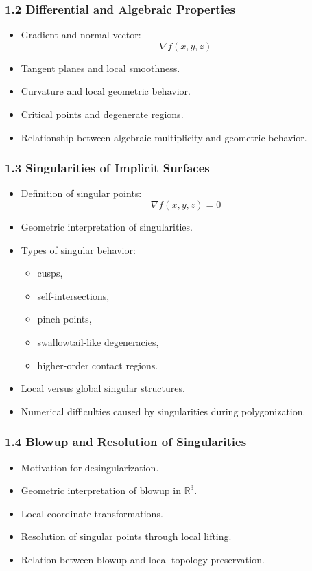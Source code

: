 \documentclass[12pt,a4paper]{article}
\begin{document}
\subsubsection*{1.2 Differential and Algebraic Properties}
\begin{itemize}
    \item Gradient and normal vector:
    \[
    \nabla f(x,y,z)
    \]
    \item Tangent planes and local smoothness.
    \item Curvature and local geometric behavior.
    \item Critical points and degenerate regions.
    \item Relationship between algebraic multiplicity and geometric behavior.
\end{itemize}

\subsubsection*{1.3 Singularities of Implicit Surfaces}
\begin{itemize}
    \item Definition of singular points:
    \[
    \nabla f(x,y,z)=0
    \]
    \item Geometric interpretation of singularities.
    \item Types of singular behavior:
    \begin{itemize}
        \item cusps,
        \item self-intersections,
        \item pinch points,
        \item swallowtail-like degeneracies,
        \item higher-order contact regions.
    \end{itemize}
    \item Local versus global singular structures.
    \item Numerical difficulties caused by singularities during polygonization.
\end{itemize}

\subsubsection*{1.4 Blowup and Resolution of Singularities}
\begin{itemize}
    \item Motivation for desingularization.
    \item Geometric interpretation of blowup in $\mathbb{R}^3$.
    \item Local coordinate transformations.
    \item Resolution of singular points through local lifting.
    \item Relation between blowup and local topology preservation.
\end{itemize}
\end{document}
